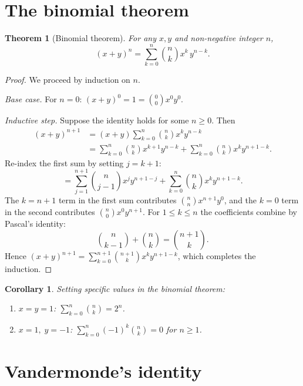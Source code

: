 \documentclass[12pt,a4paper,openany]{book}
\theoremstyle{definition}
\theoremstyle{plain}
\newtheorem{theorem}[definition]{Theorem}
\newtheorem{corollary}[definition]{Corollary}
\theoremstyle{remark}
\begin{document}
\section{The binomial theorem}
\label{sec:binomial-theorem}

\begin{theorem}[Binomial theorem]\label{thm:binomial}
For any $x, y$ and non-negative integer $n$,
\[
  (x + y)^n = \sum_{k=0}^{n} \binom{n}{k} x^{k}\, y^{n-k}.
\]
\end{theorem}

\begin{proof}
We proceed by induction on $n$.

\emph{Base case.}\; For $n = 0$: $(x+y)^0 = 1 = \binom{0}{0} x^0 y^0$.

\emph{Inductive step.}\; Suppose the identity holds for some $n \geq 0$.
Then
\begin{align*}
  (x + y)^{n+1}
    &= (x+y)\sum_{k=0}^{n}\binom{n}{k}x^k y^{n-k} \\
    &= \sum_{k=0}^{n}\binom{n}{k}x^{k+1}y^{n-k}
       + \sum_{k=0}^{n}\binom{n}{k}x^k y^{n+1-k}.
\end{align*}
Re-index the first sum by setting $j = k + 1$:
\[
  = \sum_{j=1}^{n+1}\binom{n}{j-1}x^{j}y^{n+1-j}
    + \sum_{k=0}^{n}\binom{n}{k}x^k y^{n+1-k}.
\]
The $k = n+1$ term in the first sum contributes $\binom{n}{n}x^{n+1}y^0$,
and the $k = 0$ term in the second contributes $\binom{n}{0}x^0 y^{n+1}$.
For $1 \leq k \leq n$ the coefficients combine by Pascal's identity:
\[
  \binom{n}{k-1} + \binom{n}{k} = \binom{n+1}{k}.
\]
Hence $(x+y)^{n+1} = \sum_{k=0}^{n+1}\binom{n+1}{k}x^k y^{n+1-k}$, which
completes the induction.
\end{proof}

\begin{corollary}\label{cor:binom-special}
Setting specific values in the binomial theorem:
\begin{enumerate}[label=(\roman*)]
  \item $x = y = 1$: $\displaystyle\sum_{k=0}^{n}\binom{n}{k} = 2^n$.
  \item $x = 1,\; y = -1$: $\displaystyle\sum_{k=0}^{n}(-1)^k\binom{n}{k} = 0$
        for $n \geq 1$.
\end{enumerate}
\end{corollary}

\section{Vandermonde's identity}
\label{sec:vandermonde}
\end{document}
